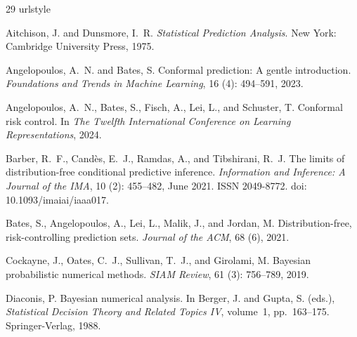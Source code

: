 \documentclass{article} %
\theoremstyle{remark}
\theoremstyle{definition}      %
\begin{document}
\begin{thebibliography}{29}
\providecommand{\natexlab}[1]{#1}
\providecommand{\url}[1]{\texttt{#1}}
\expandafter\ifx\csname urlstyle\endcsname\relax
  \providecommand{\doi}[1]{doi: #1}\else
  \providecommand{\doi}{doi: \begingroup \urlstyle{rm}\Url}\fi

Aitchison, J. and Dunsmore, I.~R.
\newblock \emph{Statistical Prediction Analysis}.
\newblock New York: Cambridge University Press, 1975.

Angelopoulos, A.~N. and Bates, S.
\newblock Conformal prediction: A gentle introduction.
\newblock \emph{Foundations and Trends in Machine Learning}, 16
  (4): 494--591, 2023.

Angelopoulos, A.~N., Bates, S., Fisch, A., Lei, L., and Schuster, T.
\newblock Conformal risk control.
\newblock In \emph{The Twelfth International Conference on Learning
  Representations}, 2024.

Barber, R.~F., Cand{\`e}s, E.~J., Ramdas, A., and Tibshirani, R.~J.
\newblock The limits of distribution-free conditional predictive inference.
\newblock \emph{Information and Inference: A Journal of the IMA}, 10
  (2): 455--482, June 2021.
\newblock ISSN 2049-8772.
\newblock \doi{10.1093/imaiai/iaaa017}.

Bates, S., Angelopoulos, A., Lei, L., Malik, J., and Jordan, M.
\newblock Distribution-free, risk-controlling prediction sets.
\newblock \emph{Journal of the {ACM}}, 68 (6), 2021.

Cockayne, J., Oates, C.~J., Sullivan, T.~J., and Girolami, M.
\newblock Bayesian probabilistic numerical methods.
\newblock \emph{SIAM Review}, 61 (3): 756--789, 2019.

Diaconis, P.
\newblock Bayesian numerical analysis.
\newblock In Berger, J. and Gupta, S. (eds.), \emph{Statistical Decision Theory
  and Related Topics IV}, volume~1, pp.\  163--175. Springer-Verlag, 1988.


\end{thebibliography}
\end{document}
